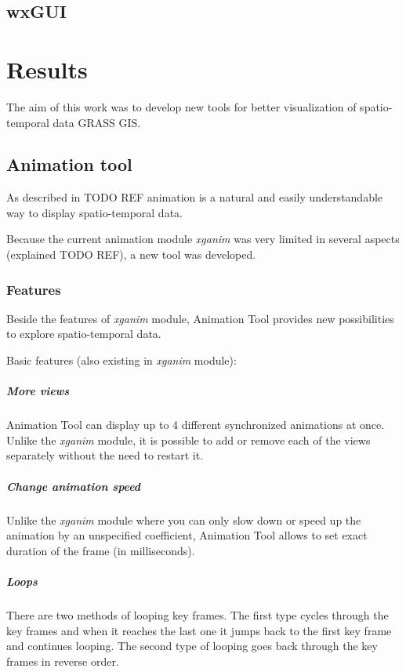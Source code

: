 \documentclass[a4paper,12pt]{book}
\newcommand{\mod}[1]{\textsl{#1}}
\newcommand{\at}{Animation Tool\xspace}
\begin{document}

\section{wxGUI}



\chapter{Results}%

The aim of this work was to develop new tools for better visualization of spatio-temporal data GRASS GIS.

\section{Animation tool}
As described in TODO REF animation is a natural and easily understandable way to display spatio-temporal data.

Because the current animation module \mod{xganim} was very limited
in several aspects (explained TODO REF), a new tool was developed.

\subsection{Features}
Beside the features of \mod{xganim} module, \at provides new possibilities
to explore spatio-temporal data.

Basic features (also existing in \mod{xganim} module):
\paragraph{More views}
\at can display up to 4 different synchronized animations at once.
Unlike the \mod{xganim} module, it is possible to add or remove each of the views separately
without the need to restart it.
\paragraph{Change animation speed}
Unlike the \mod{xganim} module where you can only
slow down or speed up the animation by an unspecified coefficient, \at allows to set
exact duration of the frame (in milliseconds).
\paragraph{Loops}
There are two methods of looping key frames.
The first type cycles through the key frames and when it reaches the last one it jumps back
to the first key frame and continues looping.
The second type of looping goes back through the key frames in reverse order.
\end{document}
